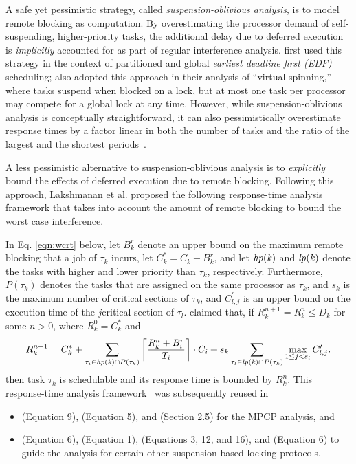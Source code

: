 A safe yet pessimistic strategy, called \emph{suspension-oblivious analysis}, is to model remote blocking as computation. By overestimating the processor demand of self-suspending, higher-priority tasks, the additional delay due to deferred execution is \emph{implicitly} accounted for as part of regular interference analysis. \cite{block-2007} first used this strategy in the context of partitioned and global \emph{earliest deadline first (EDF)} scheduling;  \cite{lakshmanan-2009} also adopted this approach in their analysis of ``virtual spinning,'' where tasks suspend when blocked on a lock, but at most one task per processor may compete for a global lock at any time. However, while suspension-oblivious analysis is conceptually straightforward, it can also pessimistically overestimate response times by a factor linear in both the number of tasks and the ratio of the largest and the shortest periods~\cite{wieder-2013}.

A less pessimistic alternative to suspension-oblivious analysis is to \emph{explicitly} bound the effects of deferred execution due to remote blocking. Following this approach, Lakshmanan et al. \cite{lakshmanan-2009} proposed the following response-time analysis framework that takes into account the amount of remote blocking to bound the worst case interference.

In Eq. \eqref{eqn:wcrt} below, let $B_k^r$ denote an upper bound on the maximum remote blocking that a job of $\tau_k$ incurs, let $C_k^{\ast} = C_k + B_k^r$, and let $\mathit{hp(k)}$ and $\mathit{lp(k)}$ denote the tasks with higher and lower priority than $\tau_k$, respectively. Furthermore, $P(\tau_k)$ denotes the tasks that are assigned on the same processor as $\tau_k$, and $s_k$ is the maximum number of critical sections of $\tau_k$, and $C_{l,j}^{\prime}$ is an upper bound on the execution time of the $j$\xth critical section of $\tau_l$. \cite{lakshmanan-2009} claimed that, if $R_k^{n+1} = R_k^n \leq D_k$ for some $n > 0$, where $R_k^0 = C_k^{\ast}$ and
\begin{equation}
\label{eqn:wcrt}
R_k^{n+1} = C_k^{\ast} + \sum_{\tau_i \in \mathit{hp(k)} \cap P(\tau_k)} \left \lceil \frac{R_k^n + B_i^r}{T_i} \right \rceil \cdot C_i + s_k \sum_{\tau_l \in \mathit{lp(k)} \cap P(\tau_k)} \max_{1 \leq j < s_l} C_{l,j}^{\prime}.  
\end{equation}
then task $\tau_k$ is schedulable and its response time is bounded by $R_k^n$. This  response-time analysis framework~\cite{lakshmanan-2009} was subsequently reused in
\begin{itemize}
\item \cite{zeng-2011} (Equation 9), \cite{han-2014}(Equation 5), and \cite{yang-2014} (Section 2.5) for the MPCP analysis, and
\item \cite{yang-2013} (Equation 6), \cite{bbb-2013} (Equation 1), \cite{carminati-2014} (Equations 3, 12, and 16), and \cite{kim-2014} (Equation 6) to guide the analysis for certain other suspension-based locking protocols.
\end{itemize}

